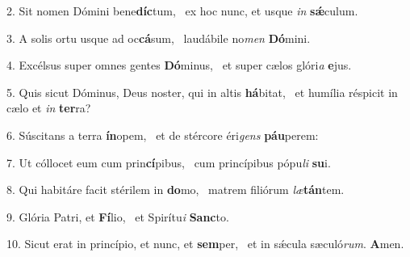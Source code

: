 2. Sit nomen Dómini bene\textbf{díc}tum, \ast\  ex hoc nunc, et usque \textit{in} \textbf{sǽ}culum.\

3. A solis ortu usque ad oc\textbf{cá}sum, \ast\  laudábile no\textit{men} \textbf{Dó}mini.\

4. Excélsus super omnes gentes \textbf{Dó}minus, \ast\  et super cælos glóri\textit{a} \textbf{e}jus.\

5. Quis sicut Dóminus, Deus noster, qui in altis \textbf{há}bitat, \ast\  et humília réspicit in cælo et \textit{in} \textbf{ter}ra?\

6. Súscitans a terra \textbf{ín}opem, \ast\  et de stércore éri\textit{gens} \textbf{páu}perem:\

7. Ut cóllocet eum cum prin\textbf{cí}pibus, \ast\  cum princípibus pópu\textit{li} \textbf{su}i.\

8. Qui habitáre facit stérilem in \textbf{do}mo, \ast\  matrem filiórum \textit{læ}\textbf{tán}tem.\

9. Glória Patri, et \textbf{Fí}lio, \ast\  et Spirítu\textit{i} \textbf{Sanc}to.\

10. Sicut erat in princípio, et nunc, et \textbf{sem}per, \ast\  et in sǽcula sæculó\textit{rum}. \textbf{A}men.\

